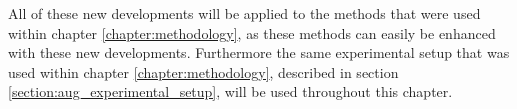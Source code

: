 All of these new developments will be applied to the methods that were used within chapter \ref{chapter:methodology}, as these methods can easily be enhanced with these new developments. Furthermore the same experimental setup that was used within chapter \ref{chapter:methodology}, described in section \ref{section:aug_experimental_setup}, will be used throughout this chapter.

